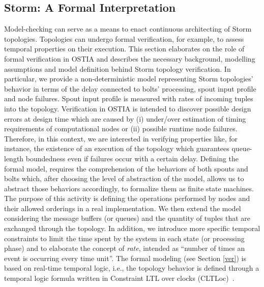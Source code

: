 \subsection{Storm: A Formal Interpretation}
Model-checking can serve as a means to enact continuous architecting of Storm topologies. Topologies can undergo formal verification, for example, to assess temporal properties on their execution.
This section elaborates on the role of formal verification in OSTIA and describes the necessary background, modelling assumptions and model definition behind Storm topology verification.
In particular, we provide a non-deterministic model representing Storm topologies' behavior in terms of the delay connected to bolts' processing, spout input profile and node failures. Spout input profile is measured with rates of incoming tuples into the topology.
Verification in OSTIA is intended to discover possible design errors at design time which are caused by (i) under/over estimation of timing requirements of computational nodes or (ii) possible runtime node failures.
Therefore, in this context, we are interested in verifying properties like, for instance, the existence of an execution of the topology which guarantees queue-length boundedness even if failures occur with a certain delay.
Defining the formal model, requires the comprehension of %
the behaviors of both spouts and bolts which, after choosing the level of abstraction of the model, allows us to abstract those behaviors accordingly, %
to formalize them as finite state machines. The purpose of this activity is defining the %
operations performed by nodes and their allowed orderings in a real implementation. %
We then extend the model %
considering the message buffers (or queues) and the quantity of tuples that are exchanged through the topology.
In addition, %
we introduce more specific temporal constraints %
to limit the time spent by the system in each state (or processing phase) and to elaborate the concept of \textit{rate}, intended as ``number of times an event is occurring every time unit''.
The formal modeling (see Section \ref{ver}) is based on real-time temporal logic, i.e., the topology behavior is defined through a temporal logic formula written in Constraint LTL over clocks (CLTLoc)~\cite{BRS15}.

